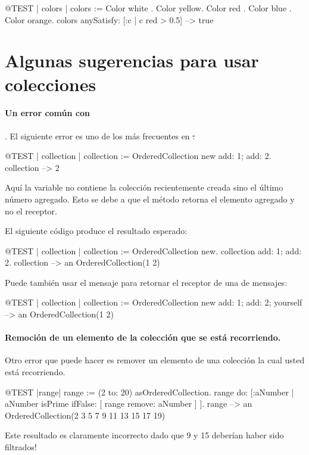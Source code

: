 \documentclass[a4paper,10pt,twoside]{book}
\begin{document}
\begin{code}{@TEST | colors | colors := {Color white . Color yellow. Color red . Color blue . Color orange}.}
colors anySatisfy: [:c | c red > 0.5] --> true
\end{code}
\section{Algunas sugerencias para usar colecciones}

\paragraph{Un error com\'un con }. El siguiente error es uno de los m\'as frecuentes en \st.

\begin{code}{@TEST | collection | }
collection := OrderedCollection new add: 1; add: 2.
collection --> 2
\end{code}
\noindent
Aqu\'i la variable  no contiene la colecci\'on recientemente creada sino el \'ultimo n\'umero agregado. 
Esto se debe a que el m\'etodo  retorna el elemento agregado y no el receptor.

El siguiente c\'odigo produce el resultado esperado:
\begin{code}{@TEST | collection |}
collection := OrderedCollection new.
collection add: 1; add: 2.
collection --> an OrderedCollection(1 2)
\end{code}

Puede tambi\'en usar el mensaje  para retornar el receptor de una  de mensajes:

\begin{code}{@TEST | collection |}
collection := OrderedCollection new add: 1; add: 2; yourself --> an OrderedCollection(1 2)
\end{code}

\paragraph{Remoci\'on de un elemento de la colecci\'on que se est\'a recorriendo.} Otro error que puede hacer es remover un elemento de una colecci\'on la cual usted est\'a recorriendo.
\begin{code}{@TEST |range|}
range := (2 to: 20) asOrderedCollection.
range do: [:aNumber | aNumber isPrime ifFalse: [ range remove: aNumber ] ].
range --> an OrderedCollection(2 3 5 7 9 11 13 15 17 19)
\end{code}
\noindent
Este resultado es claramente incorrecto dado que 9 y 15 deber\'ian haber sido filtrados!
\end{document}
